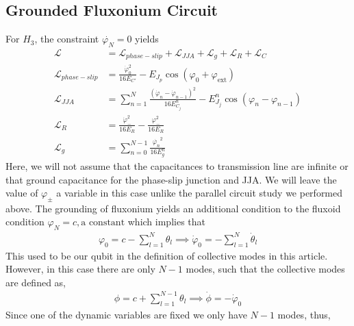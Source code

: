 \documentclass[%
reprint,
superscriptaddress,
 amsmath,amssymb,
 aps,
 prx,
longbibliography,
floatfix,
]{revtex4-2}
\begin{document}
\subsection{Grounded Fluxonium Circuit}
For $H_3$, the constraint $\dot{\varphi_{N}}=0$ yields
\begin{align}
    \mathcal{L}&=\mathcal{L}_{phase-slip}+\mathcal{L}_{JJA}+\mathcal{L}_{g}+\mathcal{L}_{R}+\mathcal{L}_{C}\\
    \mathcal{L}_{phase-slip}&=\frac{\dot{\varphi}_0^2}{16E_{C'}}-E_{J_p}\cos(\varphi_0+\varphi_\mathrm{ext})\\
    \mathcal{L}_{JJA}&=\sum_{n=1}^N\frac{(\dot{\varphi}_n-\dot{\varphi}_{n-1})^2}{16E^{n}_{C_j}}-E^{n}_{J_j}\cos(\varphi_n-\varphi_{n-1})\\
    \mathcal{L}_{R}&=\frac{\dot{\varphi}_{-}^2}{16E_{{R}}}-\frac{\varphi_{-}^2}{16E_{R}}\\
    \mathcal{L}_{g}&=\sum_{n=0}^{N-1} \frac{\dot{\varphi_n}^2}{16E^n_{g}}
  \end{align}
  Here, we will not assume that the capacitances to transmission line are infinite or that ground capacitance for the phase-slip junction and JJA. We will leave the value of $\varphi_{\pm}$ a variable in this case unlike the parallel circuit study we performed above. 
The grounding of fluxonium yields an additional condition to the fluxoid condition $\varphi_N=c, \text{a constant}$ which implies that
\begin{align}
     \varphi_0=c-\sum_{l=1}^N \theta_l\implies \dot\varphi_0=-\sum_{l=1}^N \dot\theta_l
\end{align}
This used to be our qubit in the definition of collective modes in this article. However, in this case there are only $N-1$ modes, such that the collective modes are defined as,
\begin{align}
    \phi=c+\sum_{l=1}^{N-1} \theta_l\implies \dot\phi=-\dot\varphi_{0}
\end{align}
Since one of the dynamic variables are fixed we only have $N-1$ modes, thus,
\end{document}
